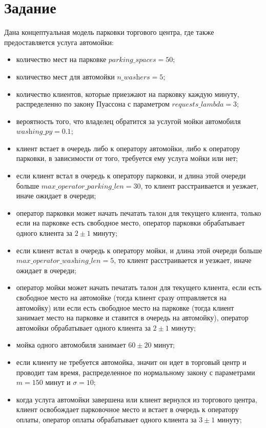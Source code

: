 \documentclass[14pt, a4paper]{extarticle}
\begin{document}


\setcounter{page}{2}

\section{Задание}



Дана концептуальная модель парковки торгового центра, где также предоставляется услуга автомойки: 
\begin{itemize}
	\item количество мест на парковке $\textit{parking\_spaces}=50$;
	\item количество мест для автомойки $\textit{n\_washers}=5$;
	
	\item количество клиентов, которые приезжают на парковку каждую минуту, распределенно по закону Пуассона с параметром $\textit{requests\_lambda}=3$;
	\item вероятность того, что владелец обратится за услугой мойки автомобиля $\textit{washing\_py}=0.1$;
	\item клиент встает в очередь либо к оператору автомойки, либо к оператору парковки, в зависимости от того, требуется ему услуга мойки или нет;

	\item если клиент встал в очередь к оператору парковки, и длина этой очереди больше $\textit{max\_operator\_parking\_len}=30$, то клиент расстраивается и уезжает, иначе ожидает в очереди;
	\item оператор парковки может начать печатать талон для текущего клиента, только если на парковке есть свободное место, оператор парковки обрабатывает одного клиента за $2\pm1$ минуту;
	
	\item если клиент встал в очередь к оператору мойки, и длина этой очереди больше $\textit{max\_operator\_washing\_len}=5$, то клиент расстраивается и уезжает, иначе ожидает в очереди;
	\item оператор мойки может начать печатать талон для текущего клиента, если есть свободное место на автомойке (тогда клиент сразу отправляется на автомойку) или если есть свободное место на парковке (тогда клиент занимает место на парковке и ставится в очередь на автомойку), оператор автомойки обрабатывает одного клиента за $2\pm1$ минуту;
	

	\item мойка одного автомобиля занимает $60\pm20$ минут;
	\item если клиенту не требуется автомойка, значит он идет в торговый центр и проводит там время, распределенное по нормальному закону с параметрами $m=150$ минут и $\sigma=10$;
		

	\item когда услуга автомойки завершена или клиент вернулся из торгового центра, клиент освобождает парковочное место и встает в очередь к оператору оплаты, оператор оплаты обрабатывает одного клиента за $3\pm1$ минуту;
	
\end{itemize}
\end{document}
